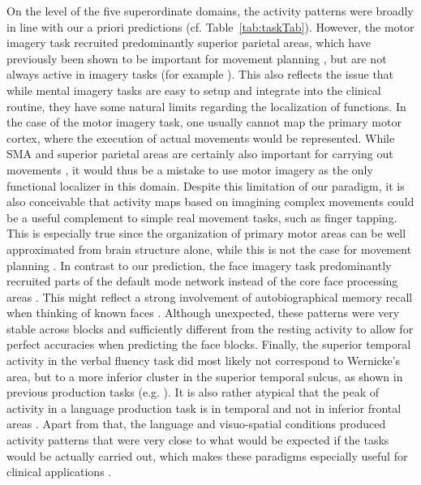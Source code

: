 \documentclass[fleqn,10pt]{SelfArx} %
\begin{document}
On the level of the five superordinate domains, the activity patterns were broadly in line with our a priori predictions (cf. Table~\ref{tab:taskTab}). However, the motor imagery task recruited predominantly superior parietal areas, which have previously been shown to be important for movement planning \citep{Aflalo_2015}, but are not always active in imagery tasks (for example \citep{Owen_2006}). This also reflects the issue that while mental imagery tasks are easy to setup and integrate into the clinical routine, they have some natural limits regarding the localization of functions. In the case of the motor imagery task, one usually cannot map the primary motor cortex, where the execution of actual movements would be represented. While SMA and superior parietal areas are certainly also important for carrying out movements \citep{Fontaine_2002, Aflalo_2015}, it would thus be a mistake to use motor imagery as the only functional localizer in this domain. Despite this limitation of our paradigm, it is also conceivable that activity maps based on imagining complex movements could be a useful complement to simple real movement tasks, such as finger tapping. This is especially true since the organization of primary motor areas can be well approximated from brain structure alone, while this is not the case for movement planning \citep{Aflalo_2015}.
In contrast to our prediction, the face imagery task predominantly recruited parts of the default mode network instead of the core face processing areas \citep{Haxby_2000}. This might reflect a strong involvement of autobiographical memory recall when thinking of known faces \citep{Gobbini_2007}. Although unexpected, these patterns were very stable across blocks and sufficiently different from the resting activity to allow for perfect accuracies when predicting the face blocks.
Finally, the superior temporal activity in the verbal fluency task did most likely not correspond to Wernicke's area, but to a more inferior cluster in the superior temporal sulcus, as shown in previous production tasks (e.g. \citep{Branco_2016}). It is also rather atypical that the peak of activity in a language production task is in temporal and not in inferior frontal areas \citep{Woermann_2003}. Apart from that, the language and visuo-spatial conditions produced activity patterns that were very close to what would be expected if the tasks would be actually carried out, which makes these paradigms especially useful for clinical applications \citep{Woermann_200, Jokeit_2001}.
\end{document}
